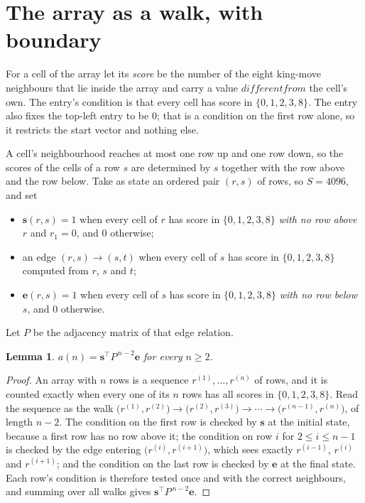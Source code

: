 \documentclass[11pt,a4paper]{article}
\theoremstyle{plain}
\newtheorem{lemma}[theorem]{Lemma}
\theoremstyle{definition}
\begin{document}
\section{The array as a walk, with boundary}

For a cell of the array let its \emph{score} be the number of the eight king-move neighbours that lie inside
the array and carry a value $different from$ the cell's own. The entry's condition is that every cell
has score in $\{0,1,2,3,8\}$. The entry also fixes the top-left entry to be $0$; that is a condition on the first row alone, so it restricts the start vector and nothing else.

A cell's neighbourhood reaches at most one row up and one row down, so the scores of the
cells of a row $s$ are determined by $s$ together with the row above and the row below.
Take as state an ordered pair $(r,s)$ of rows, so $S=4096$, and set
\begin{itemize}
\item $\mathbf{s}(r,s)=1$ when every cell of $r$ has score in $\{0,1,2,3,8\}$ \emph{with no row
above $r$} and $r_1=0$, and $0$ otherwise;
\item an edge $(r,s)\to(s,t)$ when every cell of $s$ has score in $\{0,1,2,3,8\}$ computed from
$r$, $s$ and $t$;
\item $\mathbf{e}(r,s)=1$ when every cell of $s$ has score in $\{0,1,2,3,8\}$ \emph{with no row
below $s$}, and $0$ otherwise.
\end{itemize}
Let $P$ be the adjacency matrix of that edge relation.

\begin{lemma}\label{lem:walk}
$a(n)=\mathbf{s}^{\!\top}P^{\,n-2}\mathbf{e}$ for every $n\ge2$.
\end{lemma}

\begin{proof}
An array with $n$ rows is a sequence $r^{(1)},\dots,r^{(n)}$ of rows, and it is counted
exactly when every one of its $n$ rows has all scores in $\{0,1,2,3,8\}$. Read the sequence as the
walk $\bigl(r^{(1)},r^{(2)}\bigr)\to\bigl(r^{(2)},r^{(3)}\bigr)\to\cdots\to
\bigl(r^{(n-1)},r^{(n)}\bigr)$, of length $n-2$. The condition on the first row is
checked by $\mathbf{s}$ at the initial state, because a first row has no row above it; the
condition on row $i$ for $2\le i\le n-1$ is checked by the edge entering
$\bigl(r^{(i)},r^{(i+1)}\bigr)$, which sees exactly $r^{(i-1)}$, $r^{(i)}$ and
$r^{(i+1)}$; and the condition on the last row is checked by $\mathbf{e}$ at the final
state. Each row's condition is therefore tested once and with the correct neighbours, and
summing over all walks gives $\mathbf{s}^{\!\top}P^{\,n-2}\mathbf{e}$.
\end{proof}
\end{document}
